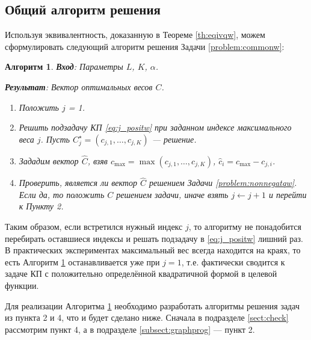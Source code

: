 \documentclass[10pt]{article}
\newtheorem{algorithm}{Алгоритм}
\begin{document}
\subsection{Общий алгоритм решения}
Используя эквивалентность, доказанную в Теореме \ref{th:eqivqw}, можем сформулировать следующий алгоритм решения Задачи \ref{problem:commonw}:

\begin{algorithm}
	\label{alg:solveqw}
	\textbf{Вход}: Параметры $L$, $K$, $\alpha$.
	
	\textbf{Результат}:
	Вектор оптимальных весов $C$.
	
	\begin{enumerate}
		\item Положить $j$ = 1.
		\item Решить подзадачу КП \eqref{eq:j_positw} при заданном индексе максимального веса $j$. Пусть $C^\star_j = (c_{j, 1}, \ldots, c_{j, K})$ --- решение.
		\item Зададим вектор $\widehat C$, взяв $c_\text{max} = \max(c_{j, 1}, \ldots, c_{j, K})$, $\hat c_i = c_\text{max} - c_{j, i}$.
		\item Проверить, является ли вектор $\widehat C$ решением Задачи \ref{problem:nonnegatqw}. Если да, то положить $C$ решением задачи, иначе взять $j \leftarrow j + 1$ и перейти к Пункту 2.
	\end{enumerate}
\end{algorithm}

Таким образом, если встретился нужный индекс $j$, то алгоритму не понадобится перебирать оставшиеся индексы и решать подзадачу в \eqref{eq:j_positw} лишний раз. В практических экспериментах максимальный вес всегда находится на краях, то есть Алгоритм \ref{alg:solveqw} останавливается уже при $j = 1$, т.е. фактически сводится к задаче КП с положительно определённой квадратичной формой в целевой функции.

Для реализации Алгоритма \ref{alg:solveqw} необходимо разработать алгоритмы решения задач из пункта 2 и 4, что и будет сделано ниже. Сначала в подразделе \ref{sect:check} рассмотрим пункт 4, а в подразделе \ref{subsect:graphprog} --- пункт 2.
\end{document}
